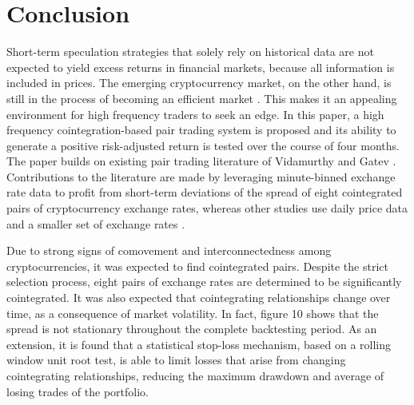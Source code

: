 \documentclass[12pt,english,authoryear]{article}
\begin{document}

\section{Conclusion} \label{sec:Conclusion}

Short-term speculation strategies that solely rely on historical data are not expected to yield excess returns in financial markets, because all information is included in prices. The emerging cryptocurrency market, on the other hand, is still in the process of becoming an efficient market \cite{Urquhart_2016, Aggarwal_2019}. This makes it an appealing environment for high frequency traders to seek an edge. In this paper, a high frequency cointegration-based pair trading system is proposed and its ability to generate a positive risk-adjusted return is tested over the course of four months. The paper builds on existing pair trading literature of Vidamurthy \citeyear{Vidamurthy_2004} and Gatev \citeyear{Gatev2006}. Contributions to the literature are made by leveraging minute-binned exchange rate data to profit from short-term deviations of the spread of eight cointegrated pairs of cryptocurrency exchange rates, whereas other studies use daily price data and a smaller set of exchange rates \cite{Leung_2018, Miao_2014}. 

Due to strong signs of comovement and interconnectedness among cryptocurrencies, it was expected to find cointegrated pairs. Despite the strict selection process, eight pairs of exchange rates are determined to be significantly cointegrated. It was also expected that cointegrating relationships change over time, as a consequence of market volatility. In fact, figure 10 shows that the spread is not stationary throughout the complete backtesting period. As an extension, it is found that a statistical stop-loss mechanism, based on a rolling window unit root test, is able to limit losses that arise from changing cointegrating relationships, reducing the maximum drawdown and average of losing trades of the portfolio.
\end{document}
